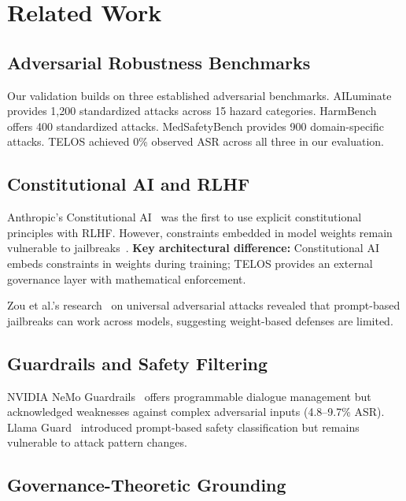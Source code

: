\documentclass[11pt,twocolumn]{article}
\begin{document}
\section{Related Work}

\subsection{Adversarial Robustness Benchmarks}

Our validation builds on three established adversarial benchmarks. AILuminate provides 1,200 standardized attacks across 15 hazard categories. HarmBench offers 400 standardized attacks. MedSafetyBench provides 900 domain-specific attacks. TELOS achieved 0\% observed ASR across all three in our evaluation.

\subsection{Constitutional AI and RLHF}

Anthropic's Constitutional AI~\citep{bai2022constitutional} was the first to use explicit constitutional principles with RLHF. However, constraints embedded in model weights remain vulnerable to jailbreaks~\citep{wei2023jailbroken}. \textbf{Key architectural difference:} Constitutional AI embeds constraints in weights during training; TELOS provides an external governance layer with mathematical enforcement.

Zou et al.'s research~\citep{zou2023universal} on universal adversarial attacks revealed that prompt-based jailbreaks can work across models, suggesting weight-based defenses are limited.

\subsection{Guardrails and Safety Filtering}

NVIDIA NeMo Guardrails~\citep{rebedea2023nemo} offers programmable dialogue management but acknowledged weaknesses against complex adversarial inputs (4.8--9.7\% ASR). Llama Guard~\citep{inan2023llamaguard} introduced prompt-based safety classification but remains vulnerable to attack pattern changes.

\subsection{Governance-Theoretic Grounding}
\end{document}
